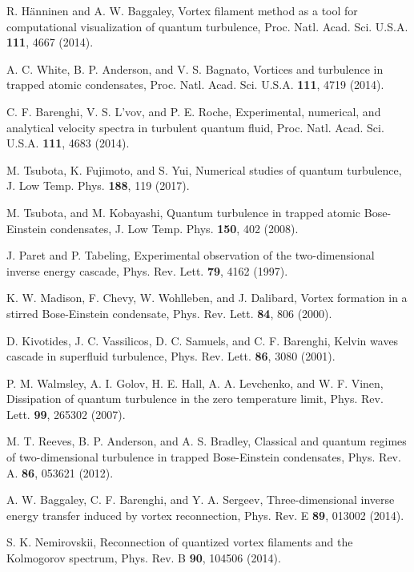 \documentclass[12pt,a4paper]{jbook}
\begin{document}
\begin{thebibliography}{99}
		R. H\"anninen and A. W. Baggaley,
		Vortex filament method as a tool for computational visualization of quantum turbulence,
		Proc. Natl. Acad. Sci. U.S.A. \textbf{111}, 4667 (2014).

		A. C. White, B. P. Anderson, and V. S. Bagnato,
		Vortices and turbulence in trapped atomic condensates,
		Proc. Natl. Acad. Sci. U.S.A. \textbf{111}, 4719 (2014).

		C. F. Barenghi, V. S. L'vov, and P. E. Roche,
		Experimental, numerical, and analytical velocity spectra in turbulent quantum fluid,
		Proc. Natl. Acad. Sci. U.S.A. \textbf{111}, 4683 (2014).

		M. Tsubota, K. Fujimoto, and S. Yui,
		Numerical studies of quantum turbulence,
		J. Low Temp. Phys. \textbf{188}, 119 (2017).

		M. Tsubota, and M. Kobayashi,
		Quantum turbulence in trapped atomic Bose-Einstein condensates,
		J. Low Temp. Phys. \textbf{150}, 402 (2008).

		J. Paret and P. Tabeling,
		Experimental observation of the two-dimensional inverse energy cascade,
		Phys. Rev. Lett. \textbf{79}, 4162 (1997).

		K. W. Madison, F. Chevy, W. Wohlleben, and J. Dalibard,
		Vortex formation in a stirred Bose-Einstein condensate,
		Phys. Rev. Lett. \textbf{84}, 806 (2000).

		D. Kivotides, J. C. Vassilicos, D. C. Samuels, and C. F. Barenghi,
		Kelvin waves cascade in superfluid turbulence,
		Phys. Rev. Lett. \textbf{86}, 3080 (2001).

		P. M. Walmsley, A. I. Golov, H. E. Hall, A. A. Levchenko, and W. F. Vinen,
		Dissipation of quantum turbulence in the zero temperature limit,
		Phys. Rev. Lett. \textbf{99}, 265302 (2007).

		M. T. Reeves, B. P. Anderson, and A. S. Bradley,
		Classical and quantum regimes of two-dimensional turbulence
		in trapped Bose-Einstein condensates,
		Phys. Rev. A. \textbf{86}, 053621 (2012).

		A. W. Baggaley, C. F. Barenghi, and Y. A. Sergeev,
		Three-dimensional inverse energy transfer induced by vortex reconnection,
		Phys. Rev. E \textbf{89}, 013002 (2014).

		S. K. Nemirovskii,
		Reconnection of quantized vortex filaments and the Kolmogorov spectrum,
		Phys. Rev. B \textbf{90}, 104506 (2014).


\end{thebibliography}
\end{document}
